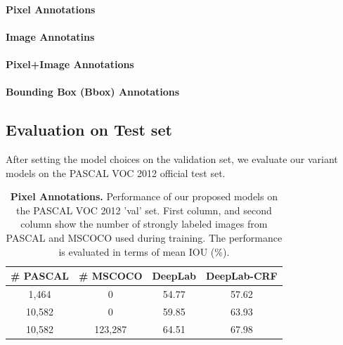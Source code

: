 \paragraph{Pixel Annotations}
\paragraph{Image Annotatins}
\paragraph{Pixel+Image Annotations}
\paragraph{Bounding Box (Bbox) Annotations}

\subsection{Evaluation on Test set}
After setting the model choices on the validation set, we evaluate our variant models on the PASCAL VOC 2012 official test set.

\begin{table}
  \centering
  \caption{{\bf{Pixel Annotations.}} Performance of our proposed models on the PASCAL VOC 2012 'val' set. First column, and second column show the number of strongly labeled images from PASCAL and MSCOCO used during training. The performance is evaluated in terms of mean IOU (\%).}
  \begin{tabular}{| c | c | c | c |}
    \hline
    \# PASCAL & \# MSCOCO & DeepLab & DeepLab-CRF \\
    \hline
    1,464  &   0     & 54.77 & 57.62  \\
    \hline
    10,582 &   0     & 59.85 & 63.93  \\
    \hline
    10,582 & 123,287 & 64.51 & 67.98 \\
    \hline
    \end{tabular}
  \label{tb:pixel_annot}
\end{table}

